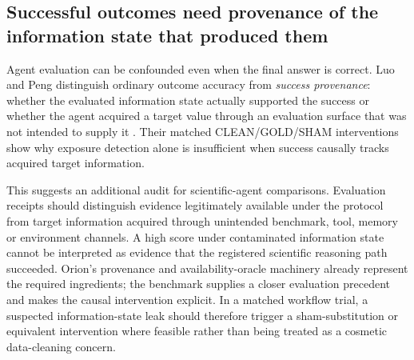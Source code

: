 \subsection{Successful outcomes need provenance of the information state that produced them}

Agent evaluation can be confounded even when the final answer is correct. Luo and Peng distinguish ordinary outcome accuracy from \emph{success provenance}: whether the evaluated information state actually supported the success or whether the agent acquired a target value through an evaluation surface that was not intended to supply it \cite{luo2026success}. Their matched CLEAN/GOLD/SHAM interventions show why exposure detection alone is insufficient when success causally tracks acquired target information.

This suggests an additional audit for scientific-agent comparisons. Evaluation receipts should distinguish evidence legitimately available under the protocol from target information acquired through unintended benchmark, tool, memory or environment channels. A high score under contaminated information state cannot be interpreted as evidence that the registered scientific reasoning path succeeded. Orion's provenance and availability-oracle machinery already represent the required ingredients; the benchmark supplies a closer evaluation precedent and makes the causal intervention explicit. In a matched workflow trial, a suspected information-state leak should therefore trigger a sham-substitution or equivalent intervention where feasible rather than being treated as a cosmetic data-cleaning concern.
